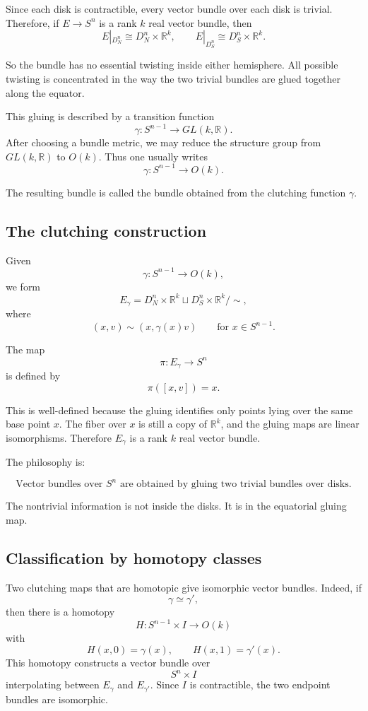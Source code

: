 \documentclass[12pt,a4paper]{article}
\theoremstyle{notespace}
\begin{document}
Since each disk is contractible, every vector bundle over each disk is trivial. Therefore, if \(E\to S^n\) is a rank \(k\) real vector bundle, then
\[
E|_{D_N^n}\cong D_N^n\times \mathbb{R}^k,
\qquad
E|_{D_S^n}\cong D_S^n\times \mathbb{R}^k.
\]

So the bundle has no essential twisting inside either hemisphere. All possible twisting is concentrated in the way the two trivial bundles are glued together along the equator.

This gluing is described by a transition function
\[
\gamma:S^{n-1}\longrightarrow GL(k,\mathbb{R}).
\]
After choosing a bundle metric, we may reduce the structure group from \(GL(k,\mathbb{R})\) to \(O(k)\). Thus one usually writes
\[
\gamma:S^{n-1}\longrightarrow O(k).
\]

The resulting bundle is called the bundle obtained from the clutching function \(\gamma\).

\subsection{The clutching construction}

Given
\[
\gamma:S^{n-1}\to O(k),
\]
we form
\[
E_\gamma
=
D_N^n\times \mathbb{R}^k
\sqcup
D_S^n\times \mathbb{R}^k
\big/ \sim,
\]
where
\[
(x,v)\sim (x,\gamma(x)v)
\qquad
\text{for }x\in S^{n-1}.
\]

The map
\[
\pi:E_\gamma\to S^n
\]
is defined by
\[
\pi([x,v])=x.
\]

This is well-defined because the gluing identifies only points lying over the same base point \(x\). The fiber over \(x\) is still a copy of \(\mathbb{R}^k\), and the gluing maps are linear isomorphisms. Therefore \(E_\gamma\) is a rank \(k\) real vector bundle.

The philosophy is:

\[
\boxed{
	\text{Vector bundles over }S^n
	\text{ are obtained by gluing two trivial bundles over disks.}
}
\]

The nontrivial information is not inside the disks. It is in the equatorial gluing map.

\subsection{Classification by homotopy classes}

Two clutching maps that are homotopic give isomorphic vector bundles. Indeed, if
\[
\gamma\simeq \gamma',
\]
then there is a homotopy
\[
H:S^{n-1}\times I\to O(k)
\]
with
\[
H(x,0)=\gamma(x),
\qquad
H(x,1)=\gamma'(x).
\]
This homotopy constructs a vector bundle over
\[
S^n\times I
\]
interpolating between \(E_\gamma\) and \(E_{\gamma'}\). Since \(I\) is contractible, the two endpoint bundles are isomorphic.
\end{document}
